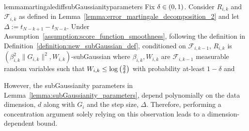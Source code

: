 \begin{restatable}{lemma}{martingalediffsubGaussianityparameters}\label{lemma:subGaussianity_parameters}
    Fix $\delta \in \left(0,1\right)$. Consider $R_{i,k}$ and $\mathcal{F}_{i,k}$ as defined in Lemma~\ref{lemma:error_martingale_decomposition_2} and let $\Delta := t_{N-k+1}-t_{N-k}$. Under Assumption~\ref{assumption:score_function_smoothness}, following the definition in Definition~\ref{definition:new_subGaussian_def}, conditioned on $\mathcal{F}_{i,k-1}$, $R_{i,k}$ is $(\beta_{i,k}^2\|G_{i,k}\|^2,W_{i,k})$-subGaussian where $\beta_{i,k},W_{i,k}$ are $\mathcal{F}_{i,k-1}$ measurable random variables such that  
    $W_{i,k} \leq \log\left(\frac{2}{\delta}\right)$ with probability at-least $1-\delta$ and
\end{restatable}

However, the subGaussianity parameters in Lemma~\ref{lemma:subGaussianity_parameters}, depend polynomially on the data dimension, $d$ along with $G_i$ and the step size, $\Delta$. Therefore, performing a concentration argument solely relying on this observation leads to a dimension-dependent bound. 



